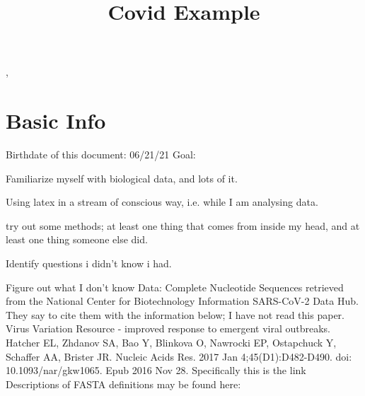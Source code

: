 \documentclass[aoas]{imsart}
\begin{document}
\begin{frontmatter}
\title{Covid Example}
\begin{aug}
\author[A]{ },
\author[B]{ }
\address[A]{Department of Mathematics, Cornell University, }
\address[B]{Department of Statistics, Cornell University, }
\end{aug}
\begin{abstract}\end{abstract}
\begin{keyword} \end{keyword}
\end{frontmatter}

\tableofcontents
\section{Basic Info}
Birthdate of this document: 06/21/21
Goal:
\item Familiarize myself with biological data, and lots of it.
\item Using latex in a stream of conscious way, i.e. while I am analysing data.
\item try out some methods; at least one thing that comes from inside my head, and at least one thing someone else did.
\item Identify questions i didn't know i had.
\item Figure out what I don't know
Data: Complete Nucleotide Sequences retrieved from the National Center for Biotechnology Information SARS-CoV-2 Data Hub.
They say to cite them with the information below; I have not read this paper.
Virus Variation Resource - improved response to emergent viral outbreaks. Hatcher EL, Zhdanov SA, Bao Y, Blinkova O, Nawrocki EP, Ostapchuck Y, Schaffer AA, Brister JR. Nucleic Acids Res. 2017 Jan 4;45(D1):D482-D490. doi: 10.1093/nar/gkw1065. Epub 2016 Nov 28.
Specifically this is the link %
Descriptions of FASTA definitions may be found here: %
\end{document}

